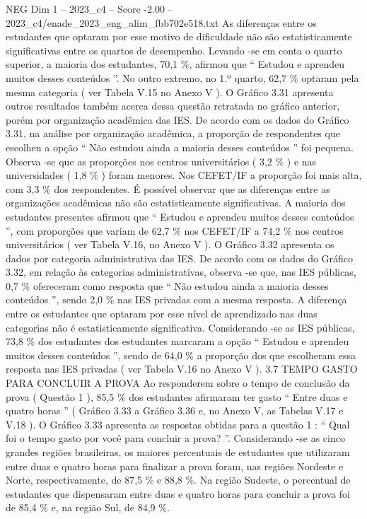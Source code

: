 \begin{textsample}{NEG Dim 1 – 2023\_c4 – Score -2.00 – 2023\_c4/enade\_2023\_eng\_alim\_fbb702e518.txt}
As diferenças entre os estudantes que optaram por esse motivo de dificuldade não são estatisticamente significativas entre os quartos de desempenho.
Levando -se em conta o quarto superior, a maioria dos estudantes, 70,1 \%, afirmou que “ Estudou e aprendeu muitos desses conteúdos ”.
No outro extremo, no 1.º quarto, 62,7 \% optaram pela mesma categoria ( ver Tabela V.15 no Anexo V ).
O Gráfico 3.31 apresenta outros resultados também acerca dessa questão retratada no gráfico anterior, porém por organização acadêmica das IES.
De acordo com os dados do Gráfico 3.31, na análise por organização acadêmica, a proporção de respondentes que escolheu a opção “ Não estudou ainda a maioria desses conteúdos ” foi pequena.
Observa -se que as proporções nos centros universitários ( 3,2 \% ) e nas universidades ( 1,8 \% ) foram menores.
Nos CEFET/IF a proporção foi mais alta, com 3,3 \% dos respondentes.
É possível observar que as diferenças entre as organizações acadêmicas não são estatisticamente significativas.
A maioria dos estudantes presentes afirmou que “ Estudou e aprendeu muitos desses conteúdos ”, com proporções que variam de 62,7 \% nos CEFET/IF a 74,2 \% nos centros universitários ( ver Tabela V.16, no Anexo V ).
O Gráfico 3.32 apresenta os dados por categoria administrativa das IES.
De acordo com os dados do Gráfico 3.32, em relação às categorias administrativas, observa -se que, nas IES públicas, 0,7 \% ofereceram como resposta que “ Não estudou ainda a maioria desses conteúdos ”, sendo 2,0 \% nas IES privadas com a mesma resposta.
A diferença entre os estudantes que optaram por esse nível de aprendizado nas duas categorias não é estatisticamente significativa.
Considerando -se as IES públicas, 73,8 \% dos estudantes dos estudantes marcaram a opção “ Estudou e aprendeu muitos desses conteúdos ”, sendo de 64,0 \% a proporção dos que escolheram essa resposta nas IES privadas ( ver Tabela V.16 no Anexo V ). 3.7 TEMPO GASTO PARA CONCLUIR A PROVA Ao responderem sobre o tempo de conclusão da prova ( Questão 1 ), 85,5 \% dos estudantes afirmaram ter gasto “ Entre duas e quatro horas ” ( Gráfico 3.33 a Gráfico 3.36 e, no Anexo V, as Tabelas V.17 e V.18 ).
O Gráfico 3.33 apresenta as respostas obtidas para a questão 1 : “ Qual foi o tempo gasto por você para concluir a prova? ”.
Considerando -se as cinco grandes regiões brasileiras, os maiores percentuais de estudantes que utilizaram entre duas e quatro horas para finalizar a prova foram, nas regiões Nordeste e Norte, respectivamente, de 87,5 \% e 88,8 \%.
Na região Sudeste, o percentual de estudantes que dispensaram entre duas e quatro horas para concluir a prova foi de 85,4 \% e, na região Sul, de 84,9 \%.

\end{textsample}
